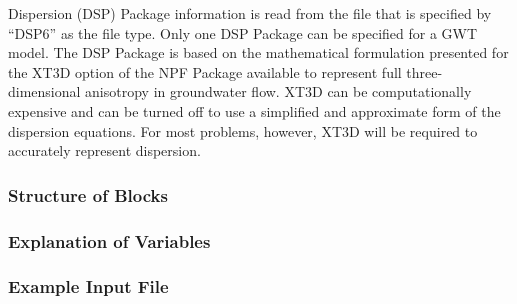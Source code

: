 Dispersion (DSP) Package information is read from the file that is specified by ``DSP6'' as the file type.  Only one DSP Package can be specified for a GWT model.  The DSP Package is based on the mathematical formulation presented for the XT3D option of the NPF Package available to represent full three-dimensional anisotropy in groundwater flow.  XT3D can be computationally expensive and can be turned off to use a simplified and approximate form of the dispersion equations.  For most problems, however, XT3D will be required to accurately represent dispersion.

\vspace{5mm}
\subsubsection{Structure of Blocks}



\vspace{5mm}
\subsubsection{Explanation of Variables}
\begin{description}

\end{description}

\vspace{5mm}
\subsubsection{Example Input File}


